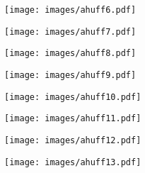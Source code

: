 \begin{frame}[allowframebreaks]
\begin{example}
  \examplebreak
                \begin{figure}[h!]
                \centering
                \texttt{[image: images/ahuff6.pdf]}
                \label{fig:ahuff6}
                \end{figure}

  \examplebreak
                \begin{figure}[h!]
                \centering
                \texttt{[image: images/ahuff7.pdf]}
                \label{fig:ahuff7}
                \end{figure}

  \examplebreak
                \begin{figure}[h!]
                \centering
                \texttt{[image: images/ahuff8.pdf]}
                \label{fig:ahuff8}
                \end{figure}

  \examplebreak
                \begin{figure}[h!]
                \centering
                \texttt{[image: images/ahuff9.pdf]}
                \label{fig:ahuff9}
                \end{figure}

  \examplebreak
                \begin{figure}[h!]
                \centering
                \texttt{[image: images/ahuff10.pdf]}
                \label{fig:ahuff10}
                \end{figure}

  \examplebreak
                \begin{figure}[h!]
                \centering
                \texttt{[image: images/ahuff11.pdf]}
                \label{fig:ahuff11}
                \end{figure}

  \examplebreak
                \begin{figure}[h!]
                \centering
                \texttt{[image: images/ahuff12.pdf]}
                \label{fig:ahuff12}
                \end{figure}

  \examplebreak
                \begin{figure}[h!]
                \centering
                \texttt{[image: images/ahuff13.pdf]}
                \label{fig:ahuff13}
                \end{figure}


\end{example}
\end{frame}
